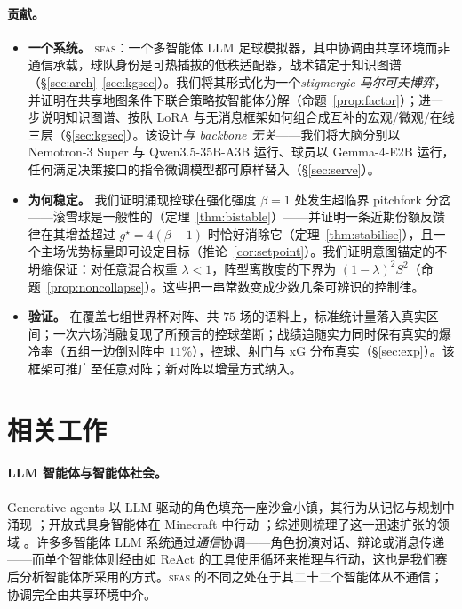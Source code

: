 \documentclass[11pt,UTF8,fontset=fandol]{ctexart}
\newcommand{\sfas}{\textsc{sfas}}
\theoremstyle{plain}
\theoremstyle{definition}
\theoremstyle{remark}
\begin{document}
\paragraph{贡献。}
\begin{itemize}
\item \textbf{一个系统。} \sfas：一个多智能体 LLM 足球模拟器，其中协调由共享环境而非通信承载，球队身份是可热插拔的低秩适配器，战术锚定于知识图谱（\S\ref{sec:arch}--\ref{sec:kgsec}）。我们将其形式化为一个\emph{stigmergic 马尔可夫博弈}，并证明在共享地图条件下联合策略按智能体分解（命题~\ref{prop:factor}）；进一步说明知识图谱、按队 LoRA 与无消息框架如何组合成互补的宏观/微观/在线三层（\S\ref{sec:kgsec}）。该设计\emph{与 backbone 无关}——我们将大脑分别以 Nemotron-3 Super 与 Qwen3.5-35B-A3B 运行、球员以 Gemma-4-E2B 运行，任何满足决策接口的指令微调模型都可原样替入（\S\ref{sec:serve}）。
\item \textbf{为何稳定。} 我们证明涌现控球在强化强度 $\beta=1$ 处发生超临界 pitchfork 分岔——滚雪球是一般性的（定理~\ref{thm:bistable}）——并证明一条近期份额反馈律在其增益超过 $g^\star=4(\beta-1)$ 时恰好消除它（定理~\ref{thm:stabilise}），且一个主场优势标量即可设定目标（推论~\ref{cor:setpoint}）。我们证明意图锚定的不坍缩保证：对任意混合权重 $\lambda<1$，阵型离散度的下界为 $(1-\lambda)^2S^2$（命题~\ref{prop:noncollapse}）。这些把一串常数变成少数几条可辨识的控制律。
\item \textbf{验证。} 在覆盖七组世界杯对阵、共 $75$ 场的语料上，标准统计量落入真实区间；一次六场消融复现了所预言的控球垄断；战绩追随实力同时保有真实的爆冷率（五组一边倒对阵中 $11\%$），控球、射门与 xG 分布真实（\S\ref{sec:exp}）。该框架可推广至任意对阵；新对阵以增量方式纳入。
\end{itemize}

\section{相关工作}\label{sec:related}

\paragraph{LLM 智能体与智能体社会。} Generative agents 以 LLM 驱动的角色填充一座沙盒小镇，其行为从记忆与规划中涌现 \citep{park2023}；开放式具身智能体在 Minecraft 中行动 \citep{wang2023voyager}；综述则梳理了这一迅速扩张的领域 \citep{wang2023survey}。许多多智能体 LLM 系统通过\emph{通信}协调——角色扮演对话、辩论或消息传递 \citep{li2023camel}——而单个智能体则经由如 ReAct \citep{yao2023} 的工具使用循环来推理与行动，这也是我们赛后分析智能体所采用的方式。\sfas{} 的不同之处在于其二十二个智能体从不通信；协调完全由共享环境中介。
\end{document}
